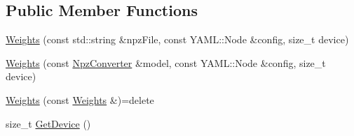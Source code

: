 \subsection*{Public Member Functions}
\begin{DoxyCompactItemize}
\item 
\hyperlink{structamunmt_1_1GPU_1_1Weights_a360340474fc01e6f9e0f1eb5e97dce77}{Weights} (const std\+::string \&npz\+File, const Y\+A\+M\+L\+::\+Node \&config, size\+\_\+t device)
\item 
\hyperlink{structamunmt_1_1GPU_1_1Weights_a17cf38fe88d08d6b5fbae781a722f33c}{Weights} (const \hyperlink{classamunmt_1_1GPU_1_1NpzConverter}{Npz\+Converter} \&model, const Y\+A\+M\+L\+::\+Node \&config, size\+\_\+t device)
\item 
\hyperlink{structamunmt_1_1GPU_1_1Weights_a99568f81de9438196644923b9b0403b4}{Weights} (const \hyperlink{structamunmt_1_1GPU_1_1Weights}{Weights} \&)=delete
\item 
size\+\_\+t \hyperlink{structamunmt_1_1GPU_1_1Weights_abfe1c75646d906c8297a7dd8b7cd89a8}{Get\+Device} ()
\end{DoxyCompactItemize}
